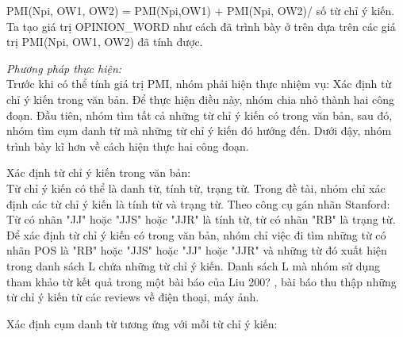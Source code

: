 \documentclass[12pt]{extarticle}
\begin{document}
				PMI(Npi, {OW1, OW2}) = PMI(Npi,OW1) + PMI(Npi, OW2)/ số từ chỉ ý kiến. 
				Ta tạo giá trị OPINION\_WORD như cách đã trình bày ở trên dựa trên các giá trị PMI(Npi, {OW1, OW2}) đã tính được.
				\par \textit{Phương pháp thực hiện:}
				\\Trước khi có thể tính giá trị PMI, nhóm phải hiện thực nhiệm vụ: Xác định từ chỉ ý kiến trong văn bản. Để thực hiện điều này, nhóm chia nhỏ thành hai công đoạn. Đầu tiên, nhóm tìm tất cả những từ chỉ ý kiến có trong văn bản, sau đó, nhóm tìm cụm danh từ mà những từ chỉ ý kiến đó hướng đến. Dưới đậy, nhóm trình bày kĩ hơn về cách hiện thực hai công đoạn.
				\par Xác định từ chỉ ý kiến trong văn bản:
				\\Từ chỉ ý kiến có thể là danh từ, tính từ, trạng từ. Trong đề tài, nhóm chỉ xác định các từ chỉ ý kiến là tính từ và trạng từ. Theo công cụ gán nhãn Stanford: Từ có nhãn "JJ" hoặc "JJS" hoặc "JJR" là tính từ, từ có nhãn "RB" là trạng từ. Để xác định từ chỉ ý kiến có trong văn bản, nhóm chỉ việc đi tìm những từ có nhãn POS là "RB" hoặc "JJS" hoặc "JJ" hoặc "JJR" và những từ đó xuất hiện trong danh sách L chứa những từ chỉ ý kiến. Danh sách L mà nhóm sử dụng tham khảo từ kết quả trong một bài báo của Liu 200? , bài báo thu thập những từ chỉ ý kiến từ các reviews về điện thoại, máy ảnh.
				\par Xác định cụm danh từ tương ứng với mỗi từ chỉ ý kiến:
\end{document}
